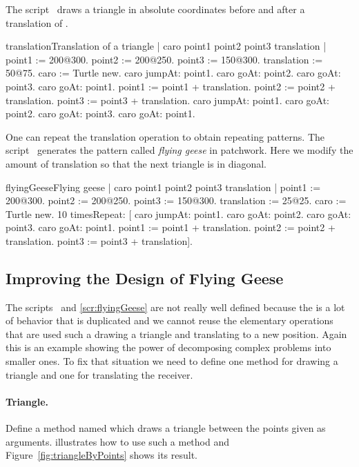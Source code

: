 The script~ draws a triangle in absolute coordinates 
before and after a translation of .

\begin{scriptfig}{translation}{Translation of a triangle}\label{scr:combinedMove}
| caro point1 point2 point3 translation |
point1 := 200@300.
point2 := 200@250.
point3 := 150@300.
translation := 50@75.
caro := Turtle new.
caro jumpAt: point1.
caro goAt: point2.
caro goAt: point3.
caro goAt: point1.
point1 := point1 + translation.
point2 := point2 + translation.
point3 := point3 + translation.
caro jumpAt: point1.
caro goAt: point2.
caro goAt: point3.
caro goAt: point1.
\end{scriptfig}

One can repeat the translation operation to obtain repeating
patterns. The script~ generates the pattern called \emph{flying
geese} in patchwork. Here we modify the amount of translation so that the next triangle is 
in diagonal.

\begin{scriptfig}{flyingGeese}{Flying geese}\label{scr:flyingGeese}
| caro point1 point2 point3 translation |
point1 := 200@300.
point2 := 200@250.
point3 := 150@300.
translation := 25@25.
caro := Turtle new.
10 timesRepeat: [
       caro jumpAt: point1.
       caro goAt: point2.
       caro goAt: point3.
       caro goAt: point1.
       point1 := point1 + translation.
       point2 := point2 + translation.
       point3 := point3 + translation].
\end{scriptfig}

\subsection{Improving the Design of Flying Geese}
The scripts~ and \ref{scr:flyingGeese} are not really well defined because
the is a lot of behavior that is duplicated and we cannot reuse the elementary operations that are used such a drawing a triangle and translating to a new position. Again this is an example showing the power of decomposing complex problems into smaller ones.  To fix that situation we need to define one method for drawing a triangle and one for translating the receiver. 

\paragraph{Triangle.}
Define a method named  which draws a triangle
 between the points given as arguments.  illustrates how to use such a method and Figure~\ref{fig:triangleByPoints} shows its result.


